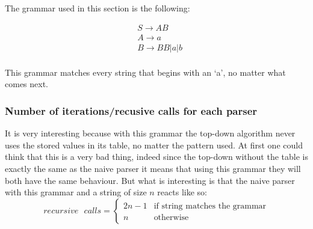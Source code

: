 The grammar used in this section is the following:

\begin{align*} 
    &S \to AB\\
    &A \to a\\
    &B \to BB|a|b\\
\end{align*}

This grammar matches every string that begins with an `a', no matter what comes next.

\subsubsection{Number of iterations/recusive calls for each parser}

It is very interesting because with this grammar the top-down algorithm never uses the stored values in its table, no matter the pattern used.
At first one could think that this is a very bad thing, indeed since the top-down without the table is exactly the same as the naive parser it means that using this grammar they will both have the same behaviour.
But what is interesting is that the naive parser with this grammar and a string of size $n$ reacts like so:
$$
recursive \text{ } calls = 
\begin{cases}
    2n - 1 &\text{if string matches the grammar}\\
    n &\text{otherwise}
\end{cases}
$$

